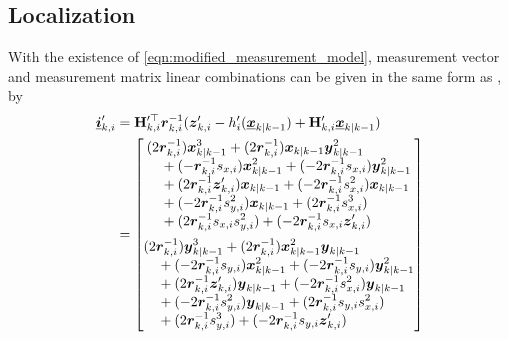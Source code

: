 \documentclass[10pt,letterpaper,oneside,twocolumn,journal]{IEEEtran}
\theoremstyle{definition}
\theoremstyle{definition}
\theoremstyle{remark}
\begin{document}
\subsection{Localization} \label{subsec:localization}
With the existence of \eqref{eqn:modified_measurement_model}, measurement vector and measurement matrix linear combinations can be given in the same form as , by
\begin{equation}
    \begin{split}
        \rvec{i}'_{k,i} &= \mat{H}_{k,i}^{\prime\top} \rv{r}_{k,i}^{-1}(\rv{z}'_{k,i} - h'_i(\rvec{x}_{k|k-1}) + \mat{H}'_{k,i}\rvec{x}_{k|k-1}) \\
        &= 
        \begin{bmatrix}
            \begin{split}
                &(2\rv{r}_{k,i}^{-1})\rv{x}_{k|k-1}^3 + (2\rv{r}_{k,i}^{-1})\rv{x}_{k|k-1}\rv{y}_{k|k-1}^2 \\
                &\quad+ (-\rv{r}_{k,i}^{-1}s_{x,i})\rv{x}_{k|k-1}^2 + (-2\rv{r}_{k,i}^{-1}s_{x,i})\rv{y}_{k|k-1}^2 \\
                &\quad+ (2\rv{r}_{k,i}^{-1}\rv{z}'_{k,i})\rv{x}_{k|k-1} + (-2\rv{r}_{k,i}^{-1}s_{x,i}^2)\rv{x}_{k|k-1}\\
                &\quad+ (-2\rv{r}_{k,i}^{-1}s_{y,i}^2)\rv{x}_{k|k-1} + (2\rv{r}_{k,i}^{-1}s_{x,i}^3) \\
                &\quad+ (2\rv{r}_{k,i}^{-1}s_{x,i}s_{y,i}^2) + (-2\rv{r}_{k,i}^{-1}s_{x,i} \rv{z}'_{k,i})
            \end{split}
            \vspace{5pt}\\
            \begin{split}
                &(2\rv{r}_{k,i}^{-1})\rv{y}_{k|k-1}^3 + (2\rv{r}_{k,i}^{-1})\rv{x}_{k|k-1}^2\rv{y}_{k|k-1} \\
                &\quad+ (-2\rv{r}_{k,i}^{-1}s_{y,i})\rv{x}_{k|k-1}^2 + (-2\rv{r}_{k,i}^{-1}s_{y,i})\rv{y}_{k|k-1}^2 \\
                &\quad+ (2\rv{r}_{k,i}^{-1}\rv{z}'_{k,i})\rv{y}_{k|k-1} + (-2\rv{r}_{k,i}^{-1}s_{x,i}^2)\rv{y}_{k|k-1} \\
                &\quad+ (-2\rv{r}_{k,i}^{-1}s_{y,i}^2)\rv{y}_{k|k-1} + (2\rv{r}_{k,i}^{-1}s_{y,i}s_{x,i}^2) \\
                &\quad+ (2\rv{r}_{k,i}^{-1}s_{y,i}^3) + (-2\rv{r}_{k,i}^{-1}s_{y,i}\rv{z}'_{k,i})
            \end{split}
        \end{bmatrix}
    \end{split} \label{eqn:hrz_linear_comb}
\end{equation}
\end{document}
